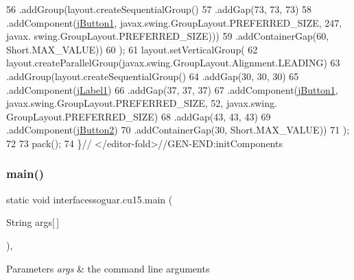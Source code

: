 \begin{DoxyCode}
56                     .addGroup(layout.createSequentialGroup()
57                         .addGap(73, 73, 73)
58                         .addComponent(\mbox{\hyperlink{classinterfacessoguar_1_1cu15_ae1acd607eefe095a62fbcf493003df08}{jButton1}}, javax.swing.GroupLayout.PREFERRED\_SIZE, 247, javax.
      swing.GroupLayout.PREFERRED\_SIZE)))
59                 .addContainerGap(60, Short.MAX\_VALUE))
60         );
61         layout.setVerticalGroup(
62             layout.createParallelGroup(javax.swing.GroupLayout.Alignment.LEADING)
63             .addGroup(layout.createSequentialGroup()
64                 .addGap(30, 30, 30)
65                 .addComponent(\mbox{\hyperlink{classinterfacessoguar_1_1cu15_a783e8806159d278353a089058f4bbcc4}{jLabel1}})
66                 .addGap(37, 37, 37)
67                 .addComponent(\mbox{\hyperlink{classinterfacessoguar_1_1cu15_ae1acd607eefe095a62fbcf493003df08}{jButton1}}, javax.swing.GroupLayout.PREFERRED\_SIZE, 52, javax.swing.
      GroupLayout.PREFERRED\_SIZE)
68                 .addGap(43, 43, 43)
69                 .addComponent(\mbox{\hyperlink{classinterfacessoguar_1_1cu15_a085521a7cfa254458af69b9b16239bc7}{jButton2}})
70                 .addContainerGap(30, Short.MAX\_VALUE))
71         );
72 
73         pack();
74     \}\textcolor{comment}{// </editor-fold>//GEN-END:initComponents}
\end{DoxyCode}
\mbox{\label{classinterfacessoguar_1_1cu15_a4769f17934ff53e5be14af89b2502753}} 
\subsubsection{\texorpdfstring{main()}{main()}}
{\footnotesize\ttfamily static void interfacessoguar.\+cu15.\+main (\begin{DoxyParamCaption}\item[{String}]{args\mbox{[}$\,$\mbox{]} }\end{DoxyParamCaption})\hspace{0.3cm}{\ttfamily [inline]}, {\ttfamily [static]}}


\begin{DoxyParams}{Parameters}
{\em args} & the command line arguments \\
\hline
\end{DoxyParams}

